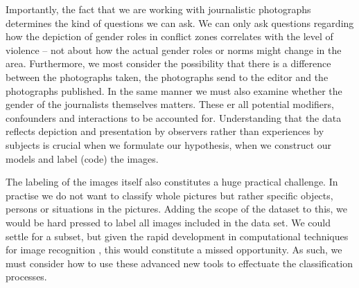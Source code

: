 \documentclass[a4paper]{article}
\begin{document}
Importantly, the fact that we are working with journalistic photographs determines the kind of questions we can ask. We can only ask questions regarding how the depiction of gender roles in conflict zones correlates with the level of violence -- not about how the actual gender roles or norms might change in the area. Furthermore, we most consider the possibility that there is a difference between the photographs taken, the photographs send to the editor and the photographs published. In the same manner we must also examine whether the gender of the journalists themselves matters. These er all potential modifiers, confounders and interactions to be accounted for. Understanding that the data reflects depiction and presentation by observers rather than experiences by subjects is crucial when we formulate our hypothesis, when we construct our models and label (code) the images.\par

The labeling of the images itself also constitutes a huge practical challenge. In practise we do not want to classify whole pictures but rather specific objects, persons or situations in the pictures. Adding the scope of the dataset to this, we would be hard pressed to label all images included in the data set. We could settle for a subset, but given the rapid development in computational techniques for image recognition \citep{williams2019images, francois2017deep}, this would constitute a missed opportunity. As such, we must consider how to use these advanced new tools to effectuate the classification processes.\par 
\end{document}
